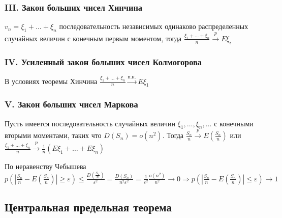 \documentclass[12pt]{article}
\begin{document}
    \subsubsection{III. Закон больших чисел Хинчина}

    \hypertarget{lawofbignumberskhinchin}{}

    \begin{MyTheorem}
        \Ths $v_n = \xi_1 + \dots + \xi_n$ последовательность независимых одинаково распределенных случайных величин с конечным первым моментом, тогда
        $\frac{\xi_1 + \dots + \xi_n}{n} \overset{p}{\longrightarrow} E\xi_i$
    \end{MyTheorem}

    \hypertarget{lawofbignumberskolmogorov}{}

    \subsubsection{IV. Усиленный закон больших чисел Колмогорова}

    В условиях теоремы Хинчина $\frac{\xi_1 + \dots + \xi_n}{n} \overset{\text{п.н.}}{\longrightarrow} E\xi_1$

    \subsubsection{V. Закон больших чисел Маркова}

    \begin{MyTheorem}
        \Ths Пусть имеется последовательность случайных величин $\xi_1, \dots, \xi_n, \dots$ с конечными вторыми моментами, таких 
        что $D(S_n) = o(n^2)$. Тогда $\frac{S_n}{n} \overset{p}{\longrightarrow} E\left(\frac{S_n}{n}\right)$ или $\frac{\xi_1 + \dots + \xi_n}{n} \overset{p}{\longrightarrow} \frac{1}{n} (E\xi_1 + \dots + E\xi_n)$
    \end{MyTheorem}

    \begin{MyProof}
        По неравенству Чебышева $p\left(\left|\frac{S_n}{n} - E\left(\frac{S_n}{n}\right)\right| \geq \varepsilon\right) \leq \frac{D\left(\frac{S_n}{n}\right)}{\varepsilon^2} = \frac{D(S_n)}{n^2 \varepsilon^2} =
        \frac{1}{\varepsilon^2} \frac{o(n^2)}{n^2} \longrightarrow 0 \Longrightarrow p\left(\left|\frac{S_n}{n} - E\left(\frac{S_n}{n}\right)\right| \leq \varepsilon\right) \longrightarrow 1$
    \end{MyProof}

    \subsection{Центральная предельная теорема}
\end{document}
